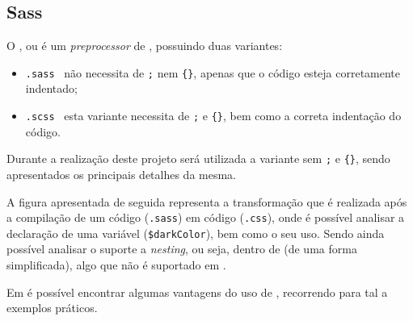 \subsection{Sass}

\begin{minipage}{.3\textwidth}
\end{minipage}
\begin{minipage}{.7\textwidth}
	\minipagerestore
	O \textbf{}, ou \underline{} é um \textit{preprocessor} de \textbf{}, possuindo duas variantes:

	\begin{itemize}
		\item \texttt{.sass} \textemdash~não necessita de \texttt{;} nem \verb|{}|, apenas que o código esteja corretamente indentado;
		\item \texttt{.scss} \textemdash~esta variante necessita de \texttt{;} e \verb|{}|, bem como a correta indentação do código.
	\end{itemize}
\end{minipage}

Durante a realização deste projeto será utilizada a variante sem \texttt{;} e \verb|{}|, sendo apresentados os principais detalhes da mesma.

A figura apresentada de seguida representa a transformação que é realizada após a compilação de um código \textbf{} (\texttt{.sass}) em código \textbf{} (\texttt{.css}), onde é possível analisar a declaração de uma variável (\verb|$darkColor|), bem como o seu uso. Sendo ainda possível analisar o suporte a \textit{nesting}, ou seja, \textbf{} dentro de \textbf{} (de uma forma simplificada), algo que não é suportado em \textbf{}.

\clearpage


Em  é possível encontrar algumas vantagens do uso de \textbf{}, recorrendo para tal a exemplos práticos.